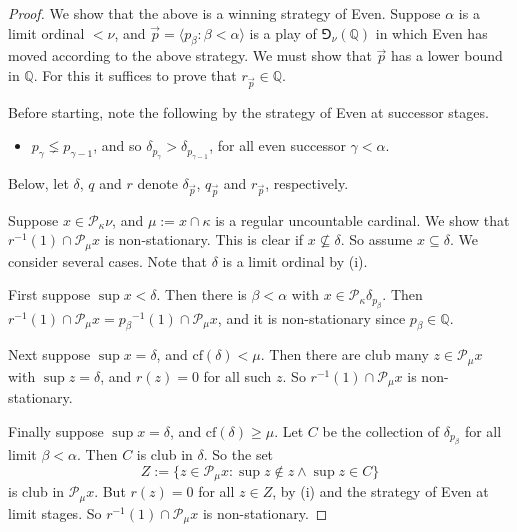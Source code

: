\documentclass[10pt,a4paper]{amsart}
\newcommand{\cof}{\mathrm{cf}}
\newcommand{\mbb}{\mathbb}
\newcommand{\mcal}{\mathcal}
\begin{document}
\begin{proof}
We show that the above is a winning strategy of Even. Suppose $\alpha$ is a limit ordinal $< \nu$, and $\vec{p} = \langle p_\beta : \beta < \alpha \rangle$ is a play of $\Game_\nu ( \mbb{Q} )$ in which Even has moved according to the above strategy. We must show that $\vec{p}$ has a lower bound in $\mbb{Q}$. For this it suffices to prove that $r_{\vec{p}} \in \mbb{Q}$.

Before starting, note the following by the strategy of Even at successor stages.
\begin{itemize}
\item[(i)] $p_\gamma \lneq p_{\gamma -1}$, and so $\delta_{p_\gamma} > \delta_{p_{\gamma -1}}$, for all even successor $\gamma < \alpha$.
\end{itemize}
Below, let $\delta$, $q$ and $r$ denote $\delta_{\vec{p}}$, $q_{\vec{p}}$ and $r_{\vec{p}}$, respectively.

Suppose $x \in \mcal{P}_\kappa \nu$, and $\mu := x \cap \kappa$ is a regular uncountable cardinal. We show that $r^{-1} (1) \cap \mcal{P}_\mu x$ is non-stationary. This is clear if $x \not\subseteq \delta$. So assume $x \subseteq \delta$. We consider several cases. Note that $\delta$ is a limit ordinal by (i).

First suppose $\sup x < \delta$. Then there is $\beta < \alpha$ with $x \in \mcal{P}_\kappa \delta_{p_\beta}$. Then $r^{-1} (1) \cap \mcal{P}_\mu x = {p_\beta}^{-1} (1) \cap \mcal{P}_\mu x$, and it is non-stationary since $p_\beta \in \mbb{Q}$.

Next suppose $\sup x = \delta$, and $\cof ( \delta ) < \mu$. Then there are club many $z \in \mcal{P}_\mu x$ with $\sup z = \delta$, and $r(z) = 0$ for all such $z$. So $r^{-1} (1) \cap \mcal{P}_\mu x$ is non-stationary.

Finally suppose $\sup x = \delta$, and $\cof ( \delta ) \geq \mu$. Let $C$ be the collection of $\delta_{p_\beta}$ for all limit $\beta < \alpha$. Then $C$ is club in $\delta$. So the set
\[
Z := \{ z \in \mcal{P}_\mu x : \sup z \notin z \wedge \sup z \in C \}
\]
is club in $\mcal{P}_\mu x$. But $r(z) = 0$ for all $z \in Z$, by (i) and the strategy of Even at limit stages. So $r^{-1} (1) \cap \mcal{P}_\mu x$ is non-stationary.
\end{proof}
\end{document}

